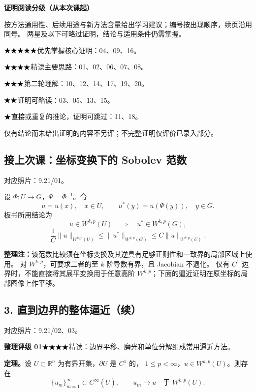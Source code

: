 \documentclass[UTF8,a4paper,11pt,fontset=fandol]{ctexart}
\newcommand{\R}{\mathbb R}
\newcommand{\ednote}[1]{\par{\small\color{notegray}\textbf{整理注：}#1}\par}
\newcommand{\source}[1]{{\small\color{notegray}对应照片：#1。}\par}
\newcommand{\proofstars}[1]{\ensuremath{%
\ifnum#1>0\relax\bigstar\fi
\ifnum#1>1\relax\bigstar\fi
\ifnum#1>2\relax\bigstar\fi
\ifnum#1>3\relax\bigstar\fi
\ifnum#1>4\relax\bigstar\fi}}
\newcommand{\proofrating}[3]{\par{\small\color{proofblue}%
\textbf{整理评级 #1}\enspace\proofstars{#2}\quad #3\par}}
\begin{document}
{\small\color{proofblue}
\textbf{证明阅读分级（从本次课起）}\par
按方法通用性、后续用途与新方法含量给出学习建议；编号按出现顺序，续页沿用同号。
两星及以下可略过证明，结论与适用条件仍需掌握。\par
\proofstars{5}\quad 优先掌握核心证明：04、09、16。\par
\proofstars{4}\quad 精读主要思路：01、02、06、07、08。\par
\proofstars{3}\quad 第二轮理解：10、12、14、17、19、20。\par
\proofstars{2}\quad 证明可略读：03、05、13、15。\par
\proofstars{1}\quad 直接或重复的推论，证明可跳过：11、18。\par
仅有结论而未给出证明的内容不另评；不完整证明仅评价已录入部分。
}
\subsection*{接上次课：坐标变换下的 Sobolev 范数}
\source{9.21/01}
设 $\Phi:U\to G$，$\Psi=\Phi^{-1}$。令
\[
u=u(x),\quad x\in U,\qquad u^*(y)=u(\Psi(y)),\quad y\in G.
\]
板书所用结论为
\[
u\in W^{k,p}(U)\quad\Longrightarrow\quad u^*\in W^{k,p}(G),
\]
\[
\frac1C\|u\|_{W^{k,p}(U)}\leq\|u^*\|_{W^{k,p}(G)}
\leq C\|u\|_{W^{k,p}(U)}.
\]
\begin{center}
\end{center}
\ednote{该范数比较须在坐标变换及其逆具有足够正则性和一致界的局部区域上使用。
对 $W^{k,p}$，可要求二者的至 $k$ 阶导数有界，且 Jacobian 不退化。
仅有 $C^1$ 边界时，不能直接将其展平变换用于任意高阶 $W^{k,p}$；下面的逼近证明在原坐标的局部图像上作平移。}

\subsection*{3. 直到边界的整体逼近（续）}
\source{9.21/02、03}
\proofrating{01}{4}{精读：边界平移、磨光和单位分解组成常用逼近方法。}
\textbf{定理。}设 $U\subset\R^n$ 为有界开集，$\partial U$ 是 $C^1$ 的，
$1\leq p<\infty$，$u\in W^{k,p}(U)$。则存在
\[
\{u_m\}_{m=1}^{\infty}\subset C^\infty(\overline U),\qquad
u_m\longrightarrow u\quad\text{于 }W^{k,p}(U).
\]
\end{document}
